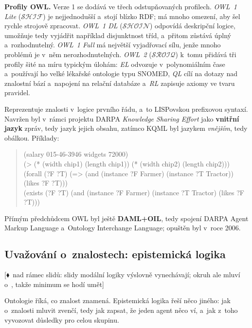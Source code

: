 \documentclass[11pt,a4paper]{article}
\theoremstyle{definition}
\newcommand{\mimoq}[1]{\textcolor{markcol}{\textsf{\footnotesize[$\blacklozenge$~nad rámec slidů: #1]}}}
\begin{document}
\textbf{Profily OWL.} Verze 1 se dodává ve třech odstupňovaných profilech. \emph{OWL~1 Lite}
($\mathcal{SHIF}$) je nejjednodušší a~stojí blízko RDF; má mnoho omezení, aby šel rychle
strojově zpracovat. \emph{OWL~1 DL} ($\mathcal{SHOIN}$) odpovídá deskripční logice, umožňuje
tedy vyjádřit například disjunktnost tříd, a~přitom zůstává úplný a~rozhodnutelný.
\emph{OWL~1 Full} má největší vyjadřovací sílu, jenže mnoho problémů je v~něm nerozhodnutelných.
\emph{OWL~2} ($\mathcal{SROIQ}$) k~tomu přidává tři profily šité na míru typickým úlohám:
\emph{EL} odvozuje v~polynomiálním čase a~používají ho velké lékařské ontologie typu SNOMED,
\emph{QL} cílí na dotazy nad znalostní bází a~napojení na relační databáze a~\emph{RL} zapisuje
axiomy ve tvaru pravidel.

\begin{defbox}
Reprezentuje znalosti v~logice prvního řádu, a~to LISPovskou prefixovou syntaxí. Navržen byl
v~rámci projektu DARPA \emph{Knowledge Sharing Effort} jako \textbf{vnitřní jazyk} zpráv, tedy
jazyk jejich obsahu, zatímco KQML byl jazykem \emph{vnějším}, tedy obálkou. Příklady:
\begin{quote}\small\ttfamily
(salary 015-46-3946 widgets 72000)\\
(> (* (width chip1) (length chip1)) (* (width chip2) (length chip2)))\\
(forall (?F ?T) (=> (and (instance ?F Farmer) (instance ?T Tractor)) (likes ?F ?T)))\\
(exists (?F ?T) (and (instance ?F Farmer) (instance ?T Tractor) (likes ?F ?T)))
\end{quote}
\end{defbox}

Přímým předchůdcem OWL byl ještě \textbf{DAML+OIL}, tedy spojení DARPA Agent Markup Language
a~Ontology Interchange Language; opuštěn byl v~roce 2006.

\subsection{Uvažování o~znalostech: epistemická logika}

\noindent\mimoq{slidy modální logiky výslovně vynechávají; okruh ale mluví o~\uv{znalostech
v~MAS}, takže minimum se hodí umět}

Ontologie říká, co znalost znamená. Epistemická logika řeší něco jiného: jak o~znalosti mluvit
zvenčí, tedy jak zapsat, že jeden agent něco ví, a~jak z~toho vyvozovat důsledky pro celou
skupinu.
\end{document}
